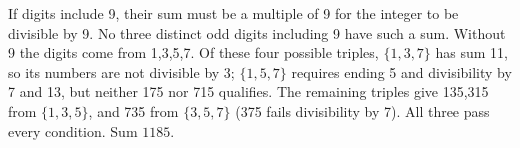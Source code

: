 If digits include 9, their sum must be a multiple of 9 for the integer to be divisible by 9. No three distinct odd digits including 9 have such a sum. Without 9 the digits come from 1,3,5,7. Of these four possible triples, $\{1,3,7\}$ has sum 11, so its numbers are not divisible by 3; $\{1,5,7\}$ requires ending 5 and divisibility by 7 and 13, but neither 175 nor 715 qualifies. The remaining triples give 135,315 from $\{1,3,5\}$, and 735 from $\{3,5,7\}$ (375 fails divisibility by 7). All three pass every condition. Sum $\boxed{1185}$.
